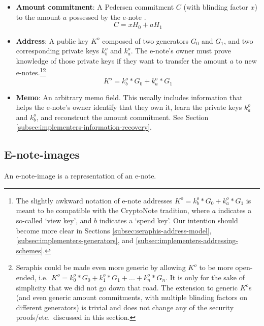 \begin{itemize}
    \item \textbf{Amount commitment}: A Pedersen commitment $C$ (with blinding factor $x$) to the amount $a$ possessed by the e-note \cite{Pedersen1992, maxwell-ct-2}.
    \[C = x H_0 + a H_1\]

    \item \textbf{Address}: A public key $K^o$ composed of two generators $G_0$ and $G_1$, and two corresponding private keys $k^o_b$ and $k^o_a$. The e-note's owner must prove knowledge of those private keys if they want to transfer the amount $a$ to new e-notes.\footnote{The slightly awkward notation of e-note addresses $K^o = k^o_b*G_0 + k^o_a*G_1$ is meant to be compatible with the CryptoNote \cite{cryptoNoteWhitePaper} tradition, where $a$ indicates a so-called `view key', and $b$ indicates a `spend key'. Our intention should become more clear in Sections \ref{subsec:seraphis-address-model}, \ref{subsec:implementers-generators}, and \ref{subsec:implementers-addressing-schemes}.}\footnote{Seraphis could be made even more generic by allowing $K^o$ to be more open-ended, i.e.\ $K^o = k^o_0*G_0 + k^o_1*G_1 + ... + k^o_n*G_n$. It is only for the sake of simplicity that we did not go down that road. The extension to generic $K^o$s (and even generic amount commitments, with multiple blinding factors on different generators) is trivial and does not change any of the security proofs/etc.\ discussed in this section.}\vspace{.115cm}
    \[K^o = k^o_b*G_0 + k^o_a*G_1\]

    \item \textbf{Memo}: An arbitrary memo field. This usually includes information that helps the e-note's owner identify that they own it, learn the private keys $k^o_a$ and $k^o_b$, and reconstruct the amount commitment. See Section \ref{subsec:implementers-information-recovery}.
\end{itemize}


\subsection{E-note-images}
\label{subsec:seraphis-e-note-images}

An e-note-image is a representation of an e-note.

